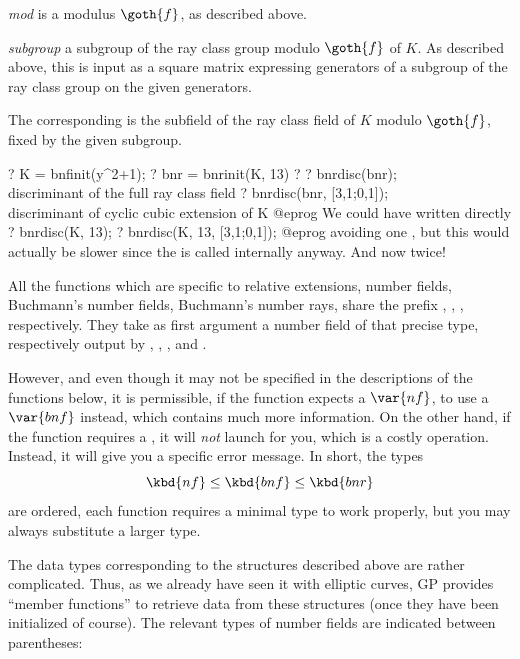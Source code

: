 \item \emph{mod} is a modulus $\goth{f}$, as described above.

\item \emph{subgroup} a subgroup of the ray class group modulo $\goth{f}$ of
$K$. As described above, this is input as a square matrix expressing
generators of a subgroup of the ray class group  on the
given generators.

The corresponding  is the subfield of the ray class field of $K$
modulo $\goth{f}$, fixed by the given subgroup.

\bprog
  ? K = bnfinit(y^2+1);
  ? bnr = bnrinit(K, 13)
  ? %
  ? bnrdisc(bnr); \\ discriminant of the full ray class field
  ? bnrdisc(bnr, [3,1;0,1]); \\ discriminant of cyclic cubic extension of K
@eprog\noindent
We could have written directly
\bprog
  ? bnrdisc(K, 13);
  ? bnrdisc(K, 13, [3,1;0,1]);
@eprog\noindent
avoiding one , but this would actually be slower since the
 is called internally anyway. And now twice!


All the functions which are specific to relative extensions, number fields,
Buchmann's number fields, Buchmann's number rays, share the prefix ,
, ,  respectively. They take as first argument a
number field of that precise type, respectively output by ,
, , and .

However, and even though it may not be specified in the descriptions of the
functions below, it is permissible, if the function expects a $\var{nf}$, to
use a $\var{bnf}$ instead, which contains much more information. On the other
hand, if the function requires a , it will \emph{not} launch
 for you, which is a costly operation. Instead, it will give you
a specific error message. In short, the types
$$ \kbd{nf} \leq \kbd{bnf} \leq \kbd{bnr}$$
are ordered, each function requires a minimal type to work properly, but you
may always substitute a larger type.

The data types corresponding to the structures described above are rather
complicated. Thus, as we already have seen it with elliptic curves, GP
provides ``member functions'' to retrieve data from these structures (once
they have been initialized of course). The relevant types of number fields
are indicated between parentheses: \smallskip

